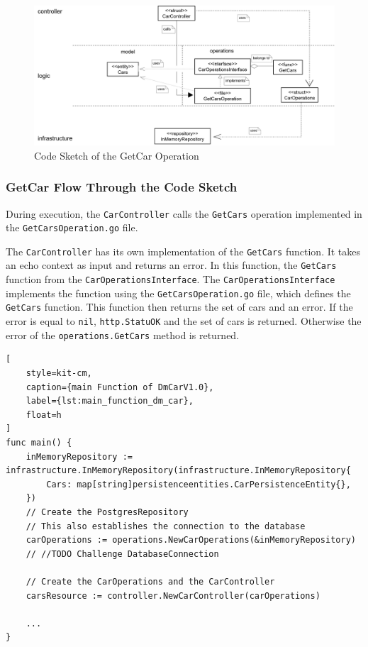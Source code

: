 \begin{figure}
    \centering
    \includegraphics[width=\textwidth]{figures/microservices/dmCar/ms_dmCar_codeSketchGetCar.png}
    \caption{Code Sketch of the GetCar Operation}
    \label{fig:ms_dmCar_getCarCodeSketch}
\end{figure}
\subsubsection*{GetCar Flow Through the Code Sketch}
During execution, the \texttt{CarController} calls the \texttt{GetCars} operation implemented in the \texttt{GetCarsOperation.go} file.

The \texttt{CarController} has its own implementation of the \texttt{GetCars} function.
It takes an echo context as input and returns an error.
In this function, the \texttt{GetCars} function from the \texttt{CarOperationsInterface}.
The \texttt{CarOperationsInterface} implements the function using the \texttt{GetCarsOperation.go} file, which defines the \texttt{GetCars} function.
This function then returns the set of cars and an error.
If the error is equal to \texttt{nil}, \texttt{http.StatuOK} and the set of cars is returned.
Otherwise the error of the \texttt{operations.GetCars} method is returned.
\begin{lstlisting}[
    style=kit-cm,
    caption={main Function of DmCarV1.0},
    label={lst:main_function_dm_car},
    float=h
]
func main() {
    inMemoryRepository := infrastructure.InMemoryRepository(infrastructure.InMemoryRepository{
        Cars: map[string]persistenceentities.CarPersistenceEntity{},
    })
    // Create the PostgresRepository
    // This also establishes the connection to the database
    carOperations := operations.NewCarOperations(&inMemoryRepository)
    // //TODO Challenge DatabaseConnection

    // Create the CarOperations and the CarController
    carsResource := controller.NewCarController(carOperations)

    ...
}
\end{lstlisting}


